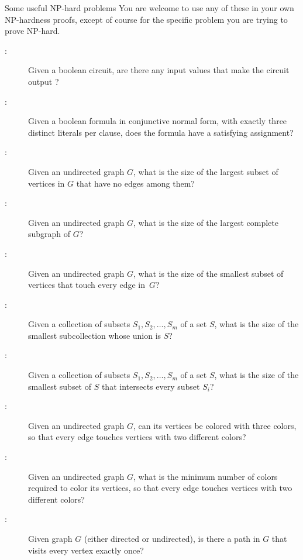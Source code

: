 \documentclass[11pt]{article}
\begin{document}
\newpage
\begin{Rubric}{Some useful NP-hard problems}
You are welcome to use any of these in your own NP-hardness proofs, except of course for the specific problem you are trying to prove NP-hard.

\begin{description}
\item[:]
Given a boolean circuit, are there any input values that make the circuit output ?

\item[:]
Given a boolean formula in conjunctive normal form, with exactly three distinct literals per clause, does the formula have a satisfying assignment?

\item[:]
Given an undirected graph $G$, what is the size of the largest subset of vertices in $G$ that have no edges among them?

\item[:]
Given an undirected graph $G$, what is the size of the largest complete subgraph of $G$?

\item[:]
Given an undirected graph $G$, what is the size of the smallest subset of vertices that touch every edge in~$G$?

\item[:]
Given a collection of subsets $S_1, S_2, \dots, S_m$ of a set $S$, what is the size of the smallest subcollection whose union is $S$?

\item[:]
Given a collection of subsets $S_1, S_2, \dots, S_m$ of a set $S$, what is the size of the smallest subset of $S$ that intersects every subset $S_i$?

\item[:]
Given an undirected graph $G$, can its vertices be colored with three colors, so that every edge touches vertices with two different colors?

\item[:]
Given an undirected graph $G$, what is the minimum number of colors required to color its vertices, so that every edge touches vertices with two different colors?

\item[:]
Given graph $G$ (either directed or undirected), is there a path in $G$ that visits every vertex exactly once?


\end{description}
\end{Rubric}
\end{document}

